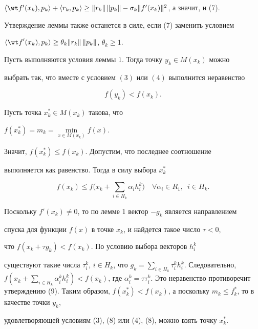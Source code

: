 $\langle \wt f'(x_k),p_k \rangle + \langle {r_k,p_k} \rangle \ge


\|{r_k} \|\,\|{p_k} \|-\sigma_k \|{{f}'(x_k)} \|^2$, а значит, и (7).


Утверждение леммы также останется в силе, если (7) заменить условием


$\langle {{\wt f}'(x_k),p_k} \rangle \ge


\theta_k \|{r_k} \|\,\|{p_k} \|$, $\theta_k\ge1$.





\begin{lem}


Пусть выполняются условия леммы $1$. Тогда точку $y_k\in M(x_k)$ можно


выбрать так, что вместе с условием $(3)$ или $(4)$ выполнится неравенство


\begin{equation}


f(y_k)<f(x_k).


\end{equation}


\end{lem}





\begin{pf}


Пусть точка $x_k^*\in M(x_k)$ такова, что


$f(x_k^*)=m_k=\min \limits_{x\in M(x_k)} f(x)$.


Значит, $f(x_k^*)\le f(x_k)$. Допустим, что последнее соотношение


выполняется как равенство. Тогда в силу выбора $x_k^*$


\begin{equation}


f(x_k)\le f\bigg(x_k+\sum_{i\in H_k} \alpha_ih_i^k\bigg)


\quad \forall \alpha_i\in R_1,\ \; i\in H_k.


\end{equation}


Поскольку ${f}'(x_k)\neq 0$, то по лемме 1 вектор $-g_k$ является направлением


спуска для функции $f(x)$ в точке $x_k$, и найдется такое число $\tau <0$,


что $f(x_k+\tau g_k)<f(x_k)$. По условию выбора векторов $h_i^k$


существуют такие числа $\tau_i^k$, $i\in H_k$, что $g_k=\sum


\limits_{i\in H_k} \tau_i^kh_i^k$. Следовательно, $f(x_k+\sum\limits


_{i\in H_k} \alpha_i^kh_i^k)<f(x_k)$, где $\alpha_i^k=\tau \tau_i


^k$. Это неравенство противоречит утверждению (9). Таким образом, $f(x_k


^*)<f(x_k)$, а поскольку $m_k\le f_k^*$, то в качестве точки $y_k$,


удовлетворяющей условиям (3), (8) или (4), (8), можно взять точку $x_k^*$.


\end{pf}





